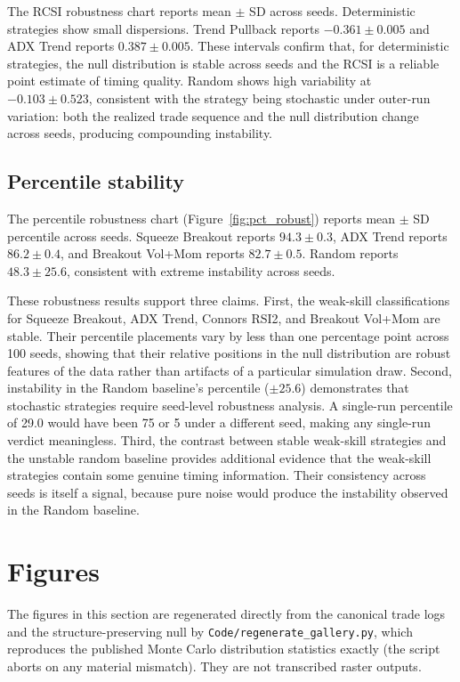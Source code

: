 \documentclass[preprint,12pt]{elsarticle}
\theoremstyle{definition}
\begin{document}
The RCSI robustness chart reports mean $\pm$ SD across seeds. Deterministic strategies show small dispersions. Trend Pullback reports $-0.361 \pm 0.005$ and ADX Trend reports $0.387 \pm 0.005$. These intervals confirm that, for deterministic strategies, the null distribution is stable across seeds and the RCSI is a reliable point estimate of timing quality. Random shows high variability at $-0.103 \pm 0.523$, consistent with the strategy being stochastic under outer-run variation: both the realized trade sequence and the null distribution change across seeds, producing compounding instability.

\subsection{Percentile stability}

The percentile robustness chart (Figure~\ref{fig:pct_robust}) reports mean $\pm$ SD percentile across seeds. Squeeze Breakout reports $94.3 \pm 0.3$, ADX Trend reports $86.2 \pm 0.4$, and Breakout Vol+Mom reports $82.7 \pm 0.5$. Random reports $48.3 \pm 25.6$, consistent with extreme instability across seeds.

These robustness results support three claims. First, the weak-skill classifications for Squeeze Breakout, ADX Trend, Connors RSI2, and Breakout Vol+Mom are stable. Their percentile placements vary by less than one percentage point across 100 seeds, showing that their relative positions in the null distribution are robust features of the data rather than artifacts of a particular simulation draw. Second, instability in the Random baseline's percentile ($\pm 25.6$) demonstrates that stochastic strategies require seed-level robustness analysis. A single-run percentile of 29.0 would have been 75 or 5 under a different seed, making any single-run verdict meaningless. Third, the contrast between stable weak-skill strategies and the unstable random baseline provides additional evidence that the weak-skill strategies contain some genuine timing information. Their consistency across seeds is itself a signal, because pure noise would produce the instability observed in the Random baseline.

\clearpage
\section{Figures}
\label{sec:figures-gallery}

The figures in this section are regenerated directly from the canonical trade logs and the structure-preserving null by \texttt{Code/regenerate\_gallery.py}, which reproduces the published Monte Carlo distribution statistics exactly (the script aborts on any material mismatch). They are not transcribed raster outputs.
\end{document}
